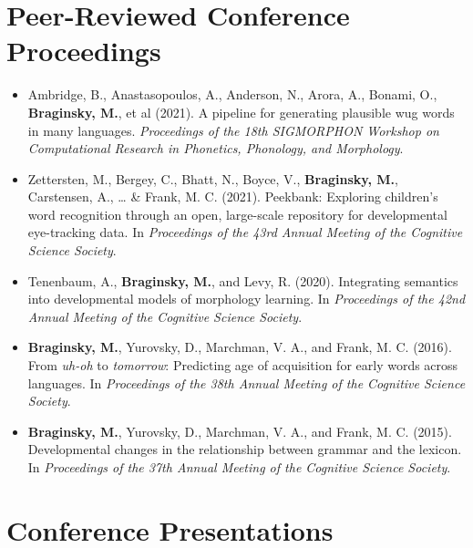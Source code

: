 \documentclass[11pt,]{article}
\begin{document}
\hypertarget{peer-reviewed-conference-proceedings}{%
\section{Peer-Reviewed Conference
Proceedings}\label{peer-reviewed-conference-proceedings}}

\begin{itemize}
\item
  Ambridge, B., Anastasopoulos, A., Anderson, N., Arora, A., Bonami, O.,
  \textbf{Braginsky, M.}, et al (2021). A pipeline for generating
  plausible wug words in many languages. \emph{Proceedings of the 18th
  SIGMORPHON Workshop on Computational Research in Phonetics, Phonology,
  and Morphology}.
\item
  Zettersten, M., Bergey, C., Bhatt, N., Boyce, V., \textbf{Braginsky,
  M.}, Carstensen, A., \ldots{} \& Frank, M. C. (2021). Peekbank:
  Exploring children's word recognition through an open, large-scale
  repository for developmental eye-tracking data. In \emph{Proceedings
  of the 43rd Annual Meeting of the Cognitive Science Society}.
\item
  Tenenbaum, A., \textbf{Braginsky, M.}, and Levy, R. (2020).
  Integrating semantics into developmental models of morphology
  learning. In \emph{Proceedings of the 42nd Annual Meeting of the
  Cognitive Science Society}.
\item
  \textbf{Braginsky, M.}, Yurovsky, D., Marchman, V. A., and Frank, M.
  C. (2016). From \emph{uh-oh} to \emph{tomorrow}: Predicting age of
  acquisition for early words across languages. In \emph{Proceedings of
  the 38th Annual Meeting of the Cognitive Science Society}.
\item
  \textbf{Braginsky, M.}, Yurovsky, D., Marchman, V. A., and Frank, M.
  C. (2015). Developmental changes in the relationship between grammar
  and the lexicon. In \emph{Proceedings of the 37th Annual Meeting of
  the Cognitive Science Society}.
\end{itemize}

\hypertarget{conference-presentations}{%
\section{Conference Presentations}\label{conference-presentations}}
\end{document}
